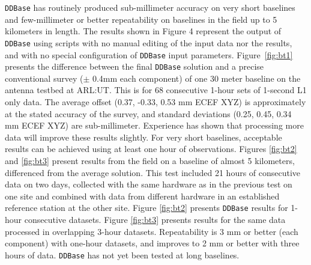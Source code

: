 \documentclass{ion-gps}
\newcommand{\gpstkapplication}[1]{\texttt{#1}}
\begin{document}
\gpstkapplication{DDBase} has routinely produced sub-millimeter
accuracy on very short baselines and few-millimeter or better
repeatability on baselines in the field up to 5 kilometers in
length. The results shown in Figure 4 represent the output of
\gpstkapplication{DDBase} using scripts with no manual editing of the
input data nor the results, and with no special configuration of
\gpstkapplication{DDBase} input parameters. Figure~\ref{fig:bt1}
presents the difference between the final \gpstkapplication{DDBase}
solution and a precise conventional survey ($\pm$ 0.4mm each component)
of one 30 meter baseline on the antenna testbed at ARL:UT. This is for
68 consecutive 1-hour sets of 1-second L1 only data. The average
offset (0.37, -0.33, 0.53 mm ECEF XYZ) is approximately at the stated
accuracy of the survey, and standard deviations (0.25, 0.45, 0.34 mm
ECEF XYZ) are sub-millimeter. Experience has shown that processing
more data will improve these results slightly. For very short baselines, 
acceptable results can be achieved using at least one hour of observations.  
Figures \ref{fig:bt2} and \ref{fig:bt3} present results from the field on a
baseline of almost 5 kilometers, differenced from the average
solution. This test included 21 hours of consecutive data on two days,
collected with the same hardware as in the previous test on one site and
combined with data from different hardware in an established reference
station at the other site. Figure \ref{fig:bt2} presents
\gpstkapplication{DDBase} results for 1-hour consecutive datasets.
Figure \ref{fig:bt3} presents results for the same data
processed in overlapping 3-hour datasets. Repeatability is 3 mm or
better (each component) with one-hour datasets, and improves to 2 mm
or better with three hours of data. \gpstkapplication{DDBase} has not
yet been tested at long baselines.
\end{document}
